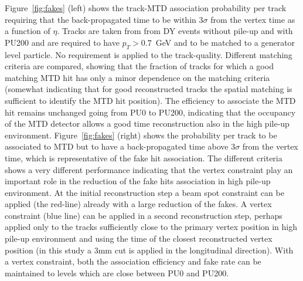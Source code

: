 Figure~\ref{fig:fakes} (left) shows the track-MTD association probability per track requiring that the back-propagated time to be within 3$\sigma$ from the vertex time as a function of $\eta$. Tracks are taken from  from DY events without pile-up and with PU200 and are required to have $p_{T}>0.7$~GeV and to be matched to a generator level particle. No requirement is applied to the track-quality. Different matching criteria are compared, showing that the fraction of tracks for which a good matching MTD hit has only a minor dependence on the matching criteria (somewhat indicating that for good reconstructed tracks the spatial matching is sufficient to identify the MTD hit position). The efficiency to associate the MTD hit remains unchanged going from PU0 to PU200, indicating that the occupancy of the MTD detector allows a good time reconstruction also in the high pile-up environment.   Figure~\ref{fig:fakes} (right) shows the probability per track to be associated to MTD but to have a back-propagated time above 3$\sigma$ from the vertex time, which is representative of the fake hit association. The different criteria shows a very different performance indicating that the vertex constraint play an important role in the reduction of the fake hits association in high pile-up environment. At the initial reconstruction step a beam spot constraint can be applied (the red-line) already with a large reduction of the fakes. A vertex constraint (blue line) can be applied in a second reconstruction step, perhaps applied only to the tracks sufficiently close to the primary vertex position in high pile-up environment and using the time of the closest reconstructed vertex position (in this study a 3mm cut is applied in the longitudinal direction). With a vertex constraint, both the association efficiency and fake rate can be maintained to levels which are close between PU0 and PU200.

